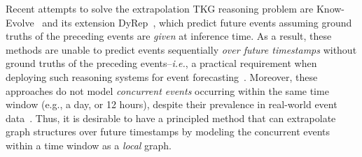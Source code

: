 \documentclass[11pt,a4paper]{article}
\newcommand{\eg}{{e.g.}}
\begin{document}

Recent attempts to solve the extrapolation TKG reasoning problem are Know-Evolve~\citep{Trivedi2017KnowEvolveDT} and its extension DyRep~\citep{Trivedi2019DyRepLR}, which predict future events assuming ground truths of the preceding events are \textit{given} at inference time.
As a result, these methods are unable to predict events sequentially \textit{over future timestamps} without ground truths of the preceding events--\textit{i.e.}, a practical requirement when deploying such reasoning systems for event forecasting~\cite{ijcai2019SAGE}.
Moreover, these approaches do not model \textit{concurrent events} occurring within the same time window (\eg, a day, or 12 hours), despite their prevalence in real-world event data~\cite{boschee2015icews,leetaru2013gdelt}.
Thus, it is desirable to have a principled method that can extrapolate graph structures over future timestamps by modeling the concurrent events within a time window as a \textit{local} graph.
\end{document}
